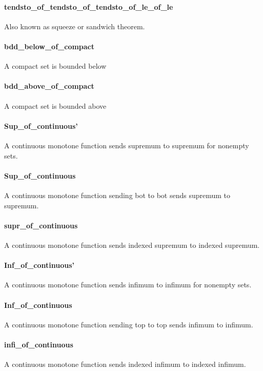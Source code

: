 \documentclass{article}
\begin{document}
\paragraph{tendsto\_of\_tendsto\_of\_tendsto\_of\_le\_of\_le}
\par
Also known as squeeze or sandwich theorem.
\paragraph{bdd\_below\_of\_compact}
\par
A compact set is bounded below
\paragraph{bdd\_above\_of\_compact}
\par
A compact set is bounded above
\paragraph{Sup\_of\_continuous'}
\par
A continuous monotone function sends supremum to supremum for nonempty sets.
\paragraph{Sup\_of\_continuous}
\par
A continuous monotone function sending bot to bot sends supremum to supremum.
\paragraph{supr\_of\_continuous}
\par
A continuous monotone function sends indexed supremum to indexed supremum.
\paragraph{Inf\_of\_continuous'}
\par
A continuous monotone function sends infimum to infimum for nonempty sets.
\paragraph{Inf\_of\_continuous}
\par
A continuous monotone function sending top to top sends infimum to infimum.
\paragraph{infi\_of\_continuous}
\par
A continuous monotone function sends indexed infimum to indexed infimum.
\end{document}
